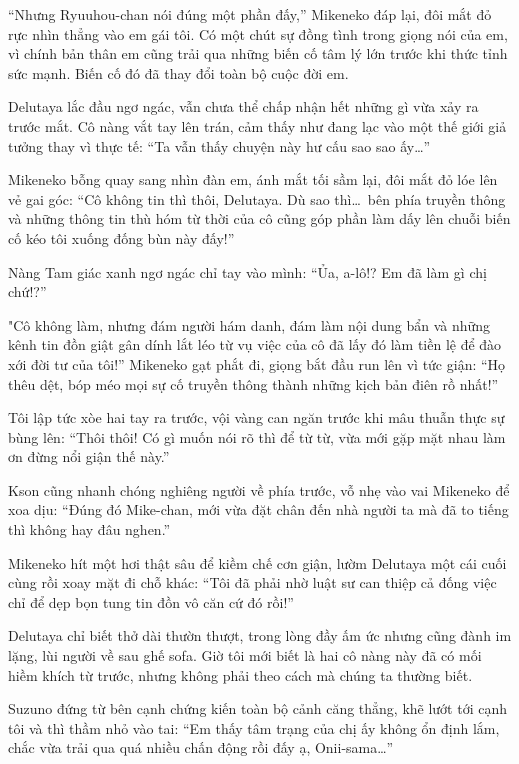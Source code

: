 ﻿\documentclass[../main.tex]{subfiles}
\begin{document}
``Nhưng Ryuuhou-chan nói đúng một phần đấy,'' Mikeneko đáp lại, đôi mắt đỏ rực nhìn thẳng vào em gái tôi. Có một chút sự đồng tình trong giọng nói của em, vì chính bản thân em cũng trải qua những biến cố tâm lý lớn trước khi thức tỉnh sức mạnh. Biến cố đó đã thay đổi toàn bộ cuộc đời em.

Delutaya lắc đầu ngơ ngác, vẫn chưa thể chấp nhận hết những gì vừa xảy ra trước mắt. Cô nàng vắt tay lên trán, cảm thấy như đang lạc vào một thế giới giả tưởng thay vì thực tế: ``Ta vẫn thấy chuyện này hư cấu sao sao ấy\dots''

Mikeneko bỗng quay sang nhìn đàn em, ánh mắt tối sầm lại, đôi mắt đỏ lóe lên vẻ gai góc: ``Cô không tin thì thôi, Delutaya. Dù sao thì\dots\ bên phía truyền thông và những thông tin thù hóm từ thời của cô cũng góp phần làm dấy lên chuỗi biến cố kéo tôi xuống đống bùn này đấy!''

Nàng Tam giác xanh ngơ ngác chỉ tay vào mình: ``Ủa, a-lô!? Em đã làm gì chị chứ!?''

"Cô không làm, nhưng đám người hám danh, đám làm nội dung bẩn và những kênh tin đồn giật gân dính lắt léo từ vụ việc của cô đã lấy đó làm tiền lệ để đào xới đời tư của tôi!'' Mikeneko gạt phắt đi, giọng bắt đầu run lên vì tức giận: ``Họ thêu dệt, bóp méo mọi sự cố truyền thông thành những kịch bản điên rồ nhất!''

Tôi lập tức xòe hai tay ra trước, vội vàng can ngăn trước khi mâu thuẫn thực sự bùng lên: ``Thôi thôi! Có gì muốn nói rõ thì để từ từ, vừa mới gặp mặt nhau làm ơn đừng nổi giận thế này.''

Kson cũng nhanh chóng nghiêng người về phía trước, vỗ nhẹ vào vai Mikeneko để xoa dịu: ``Đúng đó Mike-chan, mới vừa đặt chân đến nhà người ta mà đã to tiếng thì không hay đâu nghen.''

Mikeneko hít một hơi thật sâu để kiềm chế cơn giận, lườm Delutaya một cái cuối cùng rồi xoay mặt đi chỗ khác: ``Tôi đã phải nhờ luật sư can thiệp cả đống việc chỉ để dẹp bọn tung tin đồn vô căn cứ đó rồi!''

Delutaya chỉ biết thở dài thườn thượt, trong lòng đầy ấm ức nhưng cũng đành im lặng, lùi người về sau ghế sofa. Giờ tôi mới biết là hai cô nàng này đã có mối hiềm khích từ trước, nhưng không phải theo cách mà chúng ta thường biết.

Suzuno đứng từ bên cạnh chứng kiến toàn bộ cảnh căng thẳng, khẽ lướt tới cạnh tôi và thì thầm nhỏ vào tai: ``Em thấy tâm trạng của chị ấy không ổn định lắm, chắc vừa trải qua quá nhiều chấn động rồi đấy ạ, Onii-sama\dots''
\end{document}
